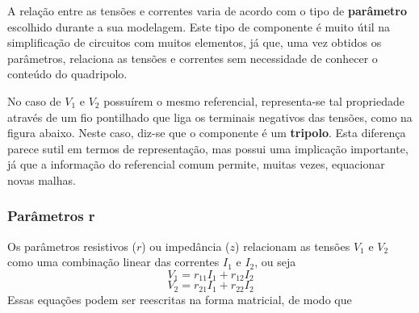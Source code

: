 \documentclass{article}
\numberwithin{equation}{section}
\begin{document}
\begin{center}
\end{center}

A relação entre as tensões e correntes varia de acordo com o tipo de \textbf{parâmetro} escolhido durante a sua modelagem. Este tipo de componente é muito útil na simplificação de circuitos com muitos elementos, já que, uma vez obtidos os parâmetros, relaciona as tensões e correntes sem necessidade de conhecer o conteúdo do quadripolo.

No caso de $V_1$ e $V_2$ possuírem o mesmo referencial, representa-se tal propriedade através de um fio pontilhado que liga os terminais negativos das tensões, como na figura abaixo. Neste caso, diz-se que o componente é um \textbf{tripolo}. Esta diferença parece sutil em termos de representação, mas possui uma implicação importante, já que a informação do referencial comum permite, muitas vezes, equacionar novas malhas.

\begin{center}
\end{center}

\subsubsection{Parâmetros r}
\label{subsubsec:quadripolosr}
Os parâmetros resistivos ($r$) ou impedância ($z$) relacionam as tensões $V_{1}$ e $V_{2}$ como uma combinação linear das correntes $I_{1}$ e $I_{2}$, ou seja
\begin{equation*}
    V_{1}=r_{11}I_{1}+r_{12}I_{2}
\end{equation*}
\begin{equation*}
    V_{2}=r_{21}I_{1}+r_{22}I_{2}
\end{equation*}
Essas equações podem ser reescritas na forma matricial, de modo que
\end{document}
